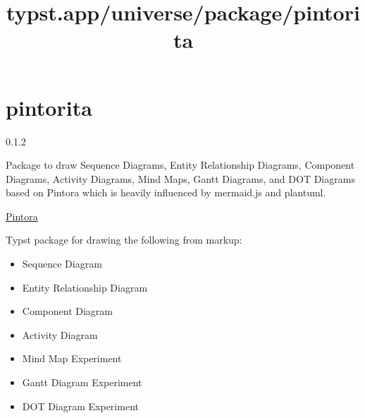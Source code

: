 \title{typst.app/universe/package/pintorita}

\label{banner}
\section{pintorita}\label{pintorita}

{ 0.1.2 }

Package to draw Sequence Diagrams, Entity Relationship Diagrams,
Component Diagrams, Activity Diagrams, Mind Maps, Gantt Diagrams, and
DOT Diagrams based on Pintora which is heavily influenced by mermaid.js
and plantuml.

\label{readme}
\href{https://pintorajs.vercel.app/}{Pintora}

Typst package for drawing the following from markup:

\begin{itemize}
\tightlist
\item
  Sequence Diagram
\item
  Entity Relationship Diagram
\item
  Component Diagram
\item
  Activity Diagram
\item
  Mind Map Experiment
\item
  Gantt Diagram Experiment
\item
  DOT Diagram Experiment
\end{itemize}

\pandocbounded{}

